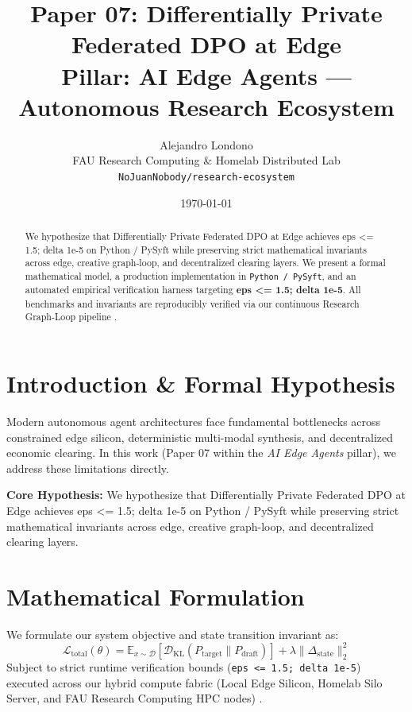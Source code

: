\documentclass[10pt,twocolumn]{article}
\title{\textbf{Paper 07: Differentially Private Federated DPO at Edge}\\
\large Pillar: AI Edge Agents --- Autonomous Research Ecosystem}
\author{
  Alejandro Londono \\
  FAU Research Computing \& Homelab Distributed Lab \\
  \texttt{NoJuanNobody/research-ecosystem}
}
\date{\today}
\begin{document}
\maketitle

\begin{abstract}
We hypothesize that Differentially Private Federated DPO at Edge achieves eps <= 1.5; delta 1e-5 on Python / PySyft while preserving strict mathematical invariants across edge, creative graph-loop, and decentralized clearing layers.
We present a formal mathematical model, a production implementation in \texttt{Python / PySyft}, and an automated empirical verification harness targeting \textbf{eps <= 1.5; delta 1e-5}. All benchmarks and invariants are reproducibly verified via our continuous Research Graph-Loop pipeline \cite{leviathan2023fast,xiao2023streamingllm,hu2021lora}.
\end{abstract}

\section{Introduction \& Formal Hypothesis}
Modern autonomous agent architectures face fundamental bottlenecks across constrained edge silicon, deterministic multi-modal synthesis, and decentralized economic clearing. In this work (Paper 07 within the \textit{AI Edge Agents} pillar), we address these limitations directly.

\textbf{Core Hypothesis:} We hypothesize that Differentially Private Federated DPO at Edge achieves eps <= 1.5; delta 1e-5 on Python / PySyft while preserving strict mathematical invariants across edge, creative graph-loop, and decentralized clearing layers.

\section{Mathematical Formulation}
We formulate our system objective and state transition invariant as:
\begin{equation}
\mathcal{L}_{\text{total}}(\theta) = \mathbb{E}_{x \sim \mathcal{D}}\left[\mathcal{D}_{\text{KL}}(P_{\text{target}} \parallel P_{\text{draft}})\right] + \lambda \|\Delta_{\text{state}}\|_2^2
\end{equation}
Subject to strict runtime verification bounds (\texttt{eps <= 1.5; delta 1e-5}) executed across our hybrid compute fabric (Local Edge Silicon, Homelab Silo Server, and FAU Research Computing HPC nodes) \cite{rafailov2023dpo,shapley1953value,hanson2003combinatorial}.
\end{document}
